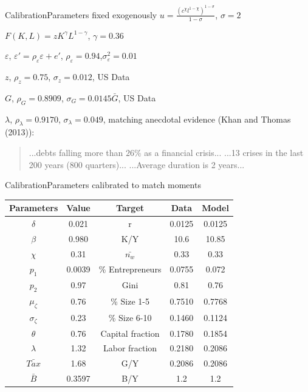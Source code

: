 \documentclass[svgnames]{beamer}
\begin{document}
\begin{frame}{Calibration}{Parameters fixed exogenously}
$u=\frac{(c^{\chi}l^{1-\chi})^{1-\sigma}}{1-\sigma}$, $\sigma=2$

$F(K,L) = zK^{\gamma}L^{1-\gamma}$, $\gamma=0.36$

$\varepsilon$, $\varepsilon'=\rho_{\varepsilon}\varepsilon + e'$, $\rho_{\varepsilon}=0.94$,$\sigma^2_{\varepsilon}=0.01$

$z$, $\rho_z=0.75$, $\sigma_z=0.012$, US Data

$G$, $\rho_G=0.8909$, $\sigma_G=0.0145\bar{G}$, US Data

$\lambda$, $\rho_{\lambda}=0.9170$, $\sigma_{\lambda}=0.049$, matching anecdotal evidence (Khan and Thomas (2013)):
\begin{quote}
...debts falling more than $26\%$ as a financial crisis...
...13 crises in the last 200 years (800 quarters)...
...Average duration is 2 years...
\end{quote}
\end{frame}

\begin{frame}{Calibration}{Parameters calibrated to match moments}
\begin{table}[htbp]
  \centering
    \begin{tabular}{ccccc}
    \toprule
    Parameters & Value & Target & Data  & Model \\
    \midrule
    $\delta$ & 0.021 & r     & 0.0125 & 0.0125 \\
    $\beta$ & 0.980 & K/Y &  10.6 & 10.85 \\
    $\chi$ & 0.31  & $\bar{n_w}$ & 0.33  & 0.33 \\
    \midrule
    $p_1$ & 0.0039  & \% Entrepreneurs & 0.0755  & 0.072 \\
    $p_2$ & 0.97 & Gini & 0.81 & 0.76 \\
    $\mu_{\zeta}$ & 0.76    & \% Size 1-5 & 0.7510 & 0.7768 \\
    $\sigma_{\zeta}$ & 0.23 & \% Size 6-10 & 0.1460 & 0.1124 \\
    \midrule
    $\theta$ & 0.76 & Capital fraction & 0.1780 & 0.1854 \\
    $\lambda$ & 1.32 & Labor fraction & 0.2180  & 0.2086 \\
    \midrule
    $\bar{Tax}$ & 1.68 & G/Y & 0.2086 & 0.2086 \\
    $\bar{B}$ & 0.3597 & B/Y & 1.2 & 1.2 \\
    \bottomrule
    \end{tabular}%
  \label{tab:addlabel}%
\end{table}%
\end{frame}
\end{document}
